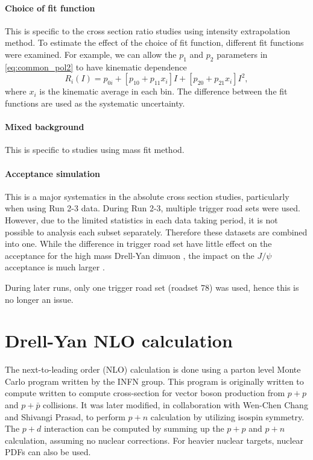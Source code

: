 \documentclass[../main.tex]{subfiles}
\begin{document}
\paragraph{Choice of fit function}
This is specific to the cross section ratio studies using intensity extrapolation method.
To estimate the effect of the choice of fit function, different fit functions were examined.
For example, we can allow the $p_1$ and $p_2$ parameters in \cref{eq:common_pol2} to have kinematic
dependence
\begin{equation}
	R_i \left(I\right) = p_{0i} + \left[p_{10}+p_{11}x_i\right] I + \left[p_{20}+p_{21}x_i\right] I^2,
\end{equation}
where $x_i$ is the kinematic average in each bin. The difference between the fit functions are used
as the systematic uncertainty.

\paragraph{Mixed background}
This is specific to studies using mass fit method.

\paragraph{Acceptance simulation}
This is a major systematics in the absolute cross section studies, particularly when using
Run 2-3 data.
During Run 2-3, multiple trigger road sets were used. However, due to the limited statistics in each
data taking period, it is not possible to analysis each subset separately. Therefore these datasets
are combined into one. While the difference in trigger road set have little effect on the acceptance
for the high mass Drell-Yan dimuon \cite{jdove-8168}, the impact on the $J/\psi$ acceptance is much
larger \cite{chleung-9643}.

During later runs, only one trigger road set (roadset 78) was used, hence this is no
longer an issue.



\section{Drell-Yan NLO calculation}
The next-to-leading order (NLO) calculation is done using a parton level Monte
Carlo program written by the INFN group\cite{catani2009,catani2007}. This program
is originally written to compute written to compute cross-section for vector boson
production from $p+p$ and $p+\bar{p}$ collisions. It was later modified, in
collaboration with Wen-Chen Chang and Shivangi Prasad, to perform $p+n$ calculation
by utilizing isospin symmetry. The $p+d$ interaction can be computed by summing up
the $p+p$ and $p+n$ calculation, assuming no nuclear corrections. For heavier nuclear
targets, nuclear PDFs can also be used.
\end{document}
